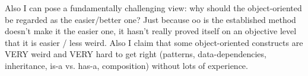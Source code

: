 Also I can pose a fundamentally challenging view: why should the object-oriented be regarded as the easier/better one? Just because oo is the established method doesn't make it the easier one, it hasn't really proved itself on an objective level that it is easier / less weird. Also I claim that some object-oriented constructs are VERY weird and VERY hard to get right (patterns, data-dependencies, inheritance, is-a vs. has-a, composition) without lots of experience.